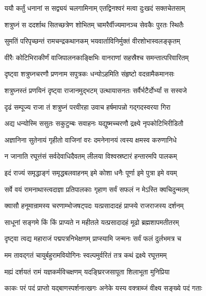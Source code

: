 \twolineshloka
{ययौ कर्तुं धनानां स सद्व्ययं चलगामिनाम्}
{एतद्विनश्वरं मत्वा दुःखदं सक्तचेतसाम्}%

\twolineshloka
{शत्रुघ्नं स ददर्शाथ सितच्छत्रेण शोभितम्}
{चामरैर्वीज्यमानञ्च सेवकैः पुरतः स्थितैः}%

\twolineshloka
{सुमतिं परिपृच्छन्तं रामचन्द्रकथानकम्}
{भयवार्ताविनिर्मुक्तं वीरशोभास्वलङ्कृतम्}%

\twolineshloka
{वीरैः कोटिभिराकीर्णं वाजिपालनकाङ्क्षिभिः}
{वानराणां सहस्रैश्च समन्तात्परिवारितम्}%

\twolineshloka
{दृष्ट्वा शत्रुघ्नचरणौ प्रणनाम सपुत्रकः}
{धन्योऽहमिति संहृष्टो वदन्रामैकमानसः}%

\twolineshloka
{शत्रुघ्नस्तं प्रणयिनं दृष्ट्वा राजानमुद्भटम्}
{उत्थायासनतः सर्वैर्भटैर्दोर्भ्यां स सस्वजे}%

\twolineshloka
{दृढं सम्पूज्य राजा तं शत्रुघ्नं परवीरहा}
{उवाच हर्षमापन्नो गद्गदस्वरया गिरा}%


\twolineshloka
{अद्य धन्योस्मि ससुतः सकुटुम्बः सवाहनः}
{यद्युष्मच्चरणौ द्रक्ष्ये नृपकोटिभिरीडितौ}%

\twolineshloka
{अज्ञानिना सुतेनायं गृहीतो वाजिनां वरः}
{दमनेनानयं त्वस्य क्षमस्व करुणानिधे}%

\twolineshloka
{न जानाति रघूत्तंसं सर्वदेवाधिदैवतम्}
{लीलया विश्वस्रष्टारं हन्तारमपि पालकम्}%

\twolineshloka
{इदं राज्यं समृद्धाङ्गं समृद्धबलवाहनम्}
{इमे कोशा धनैः पूर्णा इमे पुत्रा इमे वयम्}%

\twolineshloka
{सर्वे वयं रामनाथास्त्वदाज्ञा प्रतिपालकाः}
{गृहाण सर्वं सफलं न मेऽस्ति क्वचिदुन्मतम्}%

\twolineshloka
{क्वासौ हनूमान्रामस्य चरणाम्भोजषट्पदः}
{यत्प्रसादादहं प्राप्स्ये राजराजस्य दर्शनम्}%

\twolineshloka
{साधूनां सङ्गमे किं किं प्राप्यते न महीतले}
{यत्प्रसादादहं मूढो ब्रह्मशापमतीतरम्}%

\twolineshloka
{दृष्ट्वा त्वद्य महाराजं पद्मपत्रनिभेक्षणम्}
{प्राप्स्यामि जन्मनः सर्वं फलं दुर्लभमत्र च}%

\twolineshloka
{मम तावद्गतं चायुर्बहुरामवियोगिनः}
{स्वल्पमुर्वरितं तत्र कथं द्रक्ष्ये रघूत्तमम्}%

\twolineshloka
{मह्यं दर्शयतं रामं यज्ञकर्मविचक्षणम्}
{यदङ्घ्रिरजसापूता शिलाभूता मुनिप्रिया}%

\twolineshloka
{काकः परं पदं प्राप्तो यद्बाणस्पर्शनात्खगः}
{अनेके यस्य वक्त्राब्जं वीक्ष्य सङ्ख्ये पदं गताः}%

